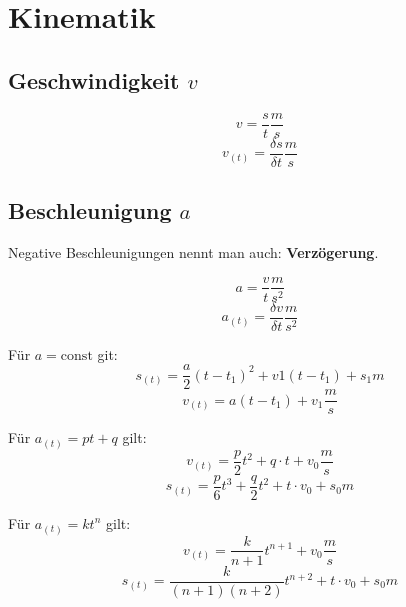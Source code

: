 %
%

\section{Kinematik}

\subsection{Geschwindigkeit $v$}
\begin{equation}
v = \frac{s}{t} \unit{\frac{m}{s}}
\end{equation}
\begin{equation}
v_{(t)} = \frac{\delta s}{\delta t} \unit{\frac{m}{s}}
\end{equation}


\subsection{Beschleunigung $a$}
Negative Beschleunigungen nennt man auch: \textbf{Verz\"ogerung}.

\begin{equation}
a = \frac{v}{t} \unit{\frac{m}{s^2}}
\end{equation}
\begin{equation}
a_{(t)} = \frac{\delta v}{\delta t} \unit{\frac{m}{s^2}}
\end{equation}

F\"ur $a=\text{const}$ git: 
\begin{equation}
s_{(t)} = \frac{a}{2}(t - t_1)^2 + v1(t - t_1) + s_1 \unit{m}
\end{equation}
\begin{equation}
v_{(t)} = a(t - t_1) + v_1 \unit{\frac{m}{s}}
\end{equation}

F\"ur $a_{(t)} = pt + q$ gilt:
\begin{equation}
v_{(t)} = \frac{p}{2}t^2 + q \cdot t + v_0 \unit{\frac{m}{s}}
\end{equation}
\begin{equation}
s_{(t)} = \frac{p}{6}t^3 + \frac{q}{2}t^2 + t \cdot v_0 + s_0 \unit{m}
\end{equation}

F\"ur $a_{(t)} = k t^n$ gilt:
\begin{equation}
v_{(t)} = \frac{k}{n+1}t^{n+1} + v_0 \unit{\frac{m}{s}}
\end{equation}
\begin{equation}
s_{(t)} = \frac{k}{(n+1)(n+2)}t^{n+2} + t \cdot v_0 + s_0 \unit{m}
\end{equation}


